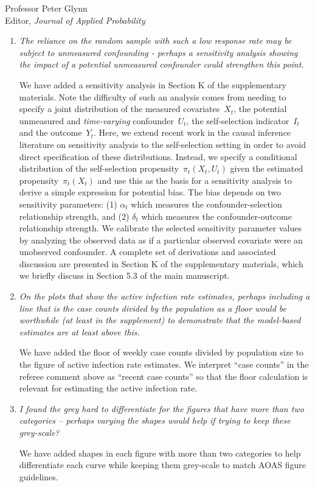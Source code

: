 \documentclass[11pt]{letter} %
\begin{document}
\begin{letter}{Professor
	Peter Glynn\\
	Editor, {\em Journal of Applied Probability}}
\begin{enumerate}
\item {\it The reliance on the random sample with such a low response rate may be subject to unmeasured confounding - perhaps a sensitivity analysis showing the impact of a potential unmeasured confounder could strengthen this point.}

\vspace{5mm}
We have added a sensitivity analysis in Section K of the supplementary materials. Note the difficulty of such an analysis comes from needing to specify a joint distribution of the measured covariates~$X_t$, the potential unmeasured and \emph{time-varying} confounder~$U_t$, the self-selection indicator~$I_t$ and the outcome~$Y_t$.  Here, we extend recent work in the causal inference literature on sensitivity analysis to the self-selection setting in order to avoid direct specification of these distributions.  Instead, we specify a conditional distribution of the self-selection propensity~$\pi_t(X_t, U_t)$ given the estimated propensity~$\pi_t (X_t)$ and use this as the basis for a sensitivity analysis to derive a simple expression for potential bias.  The bias depends on two sensitivity parameters: (1) $\alpha_t$ which measures the confounder-selection relationship strength, and (2) $\delta_t$ which measures the confounder-outcome relationship strength.  We calibrate the selected sensitivity parameter values by analyzing the observed data as if a particular observed covariate were an unobserved confounder.  A complete set of derivations and associated discussion are presented in Section K of the supplementary materials, which we briefly discuss in Section 5.3 of the main manuscript.
\vspace{5mm}

\item {\it On the plots that show the active infection rate estimates, perhaps including a line that is the case counts divided by the population as a floor would be worthwhile (at least in the supplement) to demonstrate that the model-based estimates are at least above this.}

\vspace{5mm}
We have added the floor of weekly case counts divided by population size to the figure of active infection rate estimates.  We interpret ``case counts'' in the referee comment above as ``recent case counts'' so that the floor calculation is relevant for estimating the active infection rate.
\vspace{5mm}

\item {\it I found the grey hard to differentiate for the figures that have more than two categories – perhaps varying the shapes would help if trying to keep these grey-scale?}

\vspace{5mm}
We have added shapes in each figure with more than two categories to help differentiate each curve while keeping them grey-scale to match AOAS figure guidelines.
\vspace{5mm}

\end{enumerate}

\end{letter}
\end{document}

